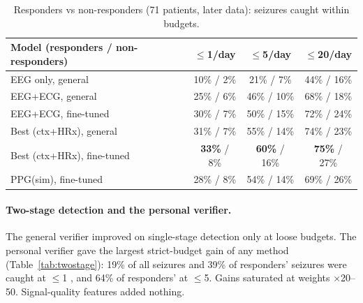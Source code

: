 \begin{table}[htbp]
\centering\small
\caption{Responders vs non-responders (71 patients, later data): seizures caught within budgets.}
\label{tab:resp}
\begin{tabular}{@{}lccc@{}}
\toprule
Model (responders / non-responders) & $\le$1/day & $\le$5/day & $\le$20/day \\
\midrule
EEG only, general & 10\% / 2\% & 21\% / 7\% & 44\% / 16\% \\
EEG+ECG, general & 25\% / 6\% & 46\% / 10\% & 68\% / 18\% \\
EEG+ECG, fine-tuned & 30\% / 7\% & 50\% / 15\% & 72\% / 24\% \\
Best (ctx+HRx), general & 31\% / 7\% & 55\% / 14\% & 74\% / 23\% \\
Best (ctx+HRx), fine-tuned & \textbf{33\%} / 8\% & \textbf{60\%} / 16\% & \textbf{75\%} / 27\% \\
PPG(sim), fine-tuned & 28\% / 8\% & 54\% / 14\% & 69\% / 26\% \\
\bottomrule
\end{tabular}
\end{table}

\paragraph{Two-stage detection and the personal verifier.} The general verifier improved on single-stage detection only at loose budgets. The personal verifier gave the largest strict-budget gain of any method (Table~\ref{tab:twostage}): 19\% of all seizures and 39\% of responders' seizures were caught at $\le$1 \FAd, and 64\% of responders' at $\le$5. Gains saturated at weights $\times$20--50. Signal-quality features added nothing.

